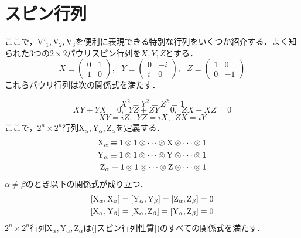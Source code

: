 \documentclass[a4paper,11pt]{jsreport}
\begin{document}
\section{スピン行列}
ここで，$\mathrm{V}'_1, \mathrm{V}_2, \mathrm{V}_3$を便利に表現できる特別な行列をいくつか紹介する．よく知られた3つの$2 \times 2$パウリスピン行列を$X, Y, Z$とする．
\begin{equation}
  X \equiv \begin{pmatrix}
    0 & 1 \\ 1 & 0
  \end{pmatrix}, \ \ \
  Y \equiv \begin{pmatrix}
    0 & -i \\ i & 0
  \end{pmatrix}, \ \ \
  Z \equiv \begin{pmatrix}
    1 & 0 \\ 0 & -1
  \end{pmatrix}
\end{equation}
これらパウリ行列は次の関係式を満たす．\par
\begin{equation*}
  X^2 = Y^2 = Z^2 = 1
\end{equation*}
\begin{equation}
  XY + YX = 0, \ \ YZ + ZY = 0, \ \ ZX + XZ = 0
  \label{スピン行列性質}
\end{equation}
\begin{equation*}
  XY = iZ, \ \ YZ = iX, \ \ ZX = iY
\end{equation*}
ここで，$2^n \times 2^n$行列$\mathrm{X}_{\alpha}, \mathrm{Y}_{\alpha}, \mathrm{Z}_{\alpha}$を定義する．
\begin{align}
  \mathrm{X}_{\alpha} \equiv 1 \otimes 1 \otimes \cdots \otimes \mathrm{X} \otimes \cdots \otimes 1 \notag \\
  \mathrm{Y}_{\alpha} \equiv 1 \otimes 1 \otimes \cdots \otimes \mathrm{Y} \otimes \cdots \otimes 1        \\
  \mathrm{Z}_{\alpha} \equiv 1 \otimes 1 \otimes \cdots \otimes \mathrm{Z} \otimes \cdots \otimes 1 \notag
  \label{2n2n行列}
\end{align}
$\alpha \neq \beta$のとき以下の関係式が成り立つ．
\begin{align}
   & [\mathrm{X}_{\alpha}, \mathrm{X}_{\beta}]
  = [\mathrm{Y}_{\alpha}, \mathrm{Y}_{\beta}]
  = [\mathrm{Z}_{\alpha}, \mathrm{Z}_{\beta}]
  = 0 \notag                                   \\
   & [\mathrm{X}_{\alpha}, \mathrm{Y}_{\beta}]
  = [\mathrm{X}_{\alpha}, \mathrm{Z}_{\beta}]
  = [\mathrm{Y}_{\alpha}, \mathrm{Z}_{\beta}]
  = 0
\end{align}
$2^n \times 2^n$行列$\mathrm{X}_{\alpha}, \mathrm{Y}_{\alpha}, \mathrm{Z}_{\alpha}$は(\ref{スピン行列性質})のすべての関係式を満たす．
\end{document}
